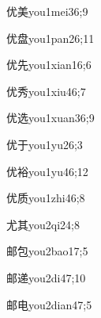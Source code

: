 \begin{verbete}{优美}{you1mei3}{6;9}
\end{verbete}

\begin{verbete}{优盘}{you1pan2}{6;11}
\end{verbete}

\begin{verbete}{优先}{you1xian1}{6;6}
\end{verbete}

\begin{verbete}{优秀}{you1xiu4}{6;7}
\end{verbete}

\begin{verbete}{优选}{you1xuan3}{6;9}
\end{verbete}

\begin{verbete}{优于}{you1yu2}{6;3}
\end{verbete}

\begin{verbete}{优裕}{you1yu4}{6;12}
\end{verbete}

\begin{verbete}{优质}{you1zhi4}{6;8}
\end{verbete}

\begin{verbete}{尤其}{you2qi2}{4;8}
\end{verbete}

\begin{verbete}{邮包}{you2bao1}{7;5}
\end{verbete}

\begin{verbete}{邮递}{you2di4}{7;10}
\end{verbete}

\begin{verbete}{邮电}{you2dian4}{7;5}
\end{verbete}

